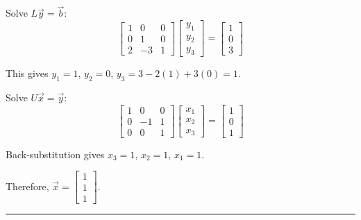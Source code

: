 \documentclass[reqno]{exam}
\begin{document}
\begin{questions}
\begin{solution}
    Solve $L\vec{y} = \vec{b}$:
    $$\begin{bmatrix} 1 & 0 & 0 \\ 0 & 1 & 0 \\ 2 & -3 & 1 \end{bmatrix} \begin{bmatrix} y_1 \\ y_2 \\ y_3 \end{bmatrix} = \begin{bmatrix} 1 \\ 0 \\ 3 \end{bmatrix}$$
    
    This gives $y_1 = 1$, $y_2 = 0$, $y_3 = 3 - 2(1) + 3(0) = 1$.

    Solve $U\vec{x} = \vec{y}$:
    $$\begin{bmatrix} 1 & 0 & 0 \\ 0 & -1 & 1 \\ 0 & 0 & 1 \end{bmatrix} \begin{bmatrix} x_1 \\ x_2 \\ x_3 \end{bmatrix} = \begin{bmatrix} 1 \\ 0 \\ 1 \end{bmatrix}$$
    
    Back-substitution gives $x_3 = 1$, $x_2 = 1$, $x_1 = 1$.
    
    Therefore, $\vec{x} = \begin{bmatrix} 1 \\ 1 \\ 1 \end{bmatrix}$.
  \end{solution}



  \newpage
  \:  
  \vfill 
  \hrule 


\end{questions}
\end{document}
